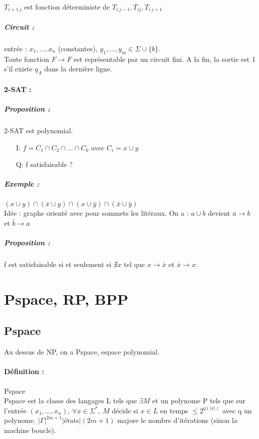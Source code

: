 \documentclass[12pt,a4paper]{report}
\begin{document}
\begin{figure}[h!]
	\centering
  \scalebox{0.7}{}
\end{figure}

$T_{i+1\ j}$ est fonction déterministe de $T_{i\ j-1}, T_{ij}, T_{i\ j+1}$
\subparagraph{Circuit :\\}
entrée : $x_1, \ldots, x_n$ (constantes), $y_1, \ldots, y_m \in \Sigma \cup \{b\}$. \\
Toute fonction $F \rightarrow F$ est représentable par un circuit fini. A la fin, la sortie est 1 s'il existe $q_A$ dans la dernière ligne.

\paragraph{2-SAT :}
\subparagraph{Proposition :}
2-SAT est polynomial.
\begin{itemize}
\item[I:] $f=C_1 \cap C_2 \cap \ldots \cap C_k$ avec $C_i = x \cup y $
\item[Q:] f satisfaisable ?
\end{itemize}
\subparagraph{Exemple :} $(x \cup y) \cap (\bar{x} \cup y) \cap (x \cup \bar{y}) \cap (\bar{x} \cup \bar{y})$\\
Idée : graphe orienté avec pour sommets les litéraux. On a : $a \cup b$ devient $\bar{a} \rightarrow b$ et $ \bar{b} \rightarrow a$

\begin{figure}[h!]
	\centering
  \scalebox{0.7}{}
\end{figure}


\subparagraph{Proposition :\\} 
f est satisfaisable si et seulement si $\nexists x$ tel que $x \rightarrow \bar{x}$ et $ \bar{x} \rightarrow x$.

\section{Pspace, RP, BPP}
\subsection{Pspace}
Au dessus de NP, on a Pspace, espace polynomial.
\paragraph{Définition :} Pspace \\
Pspace est la classe des langages L tels que $\exists M$ et un polynome P tels que sur l'entrée $(x_1,\ldots,x_n),\ \forall x \in \Sigma^*,\ M$ décide si $x \in L$ en temps $\leqslant 2^{q(|x|)}$ avec q un polynome. $|\Gamma|^{2m+1}|\mbox{états}|(2m+1)$ majore le nombre d'itérations (sinon la machine boucle).
\end{document}
